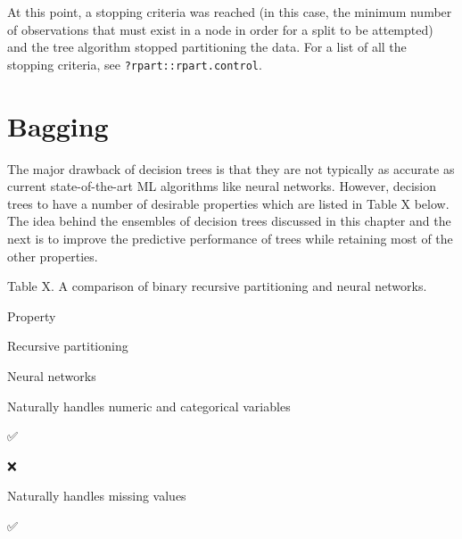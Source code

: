 \documentclass[]{book}
\newenvironment{Shaded}{\begin{snugshade}}{\end{snugshade}}
\newcommand{\CommentTok}[1]{\textcolor[rgb]{0.56,0.35,0.01}{\textit{#1}}}
\newcommand{\DecValTok}[1]{\textcolor[rgb]{0.00,0.00,0.81}{#1}}
\newcommand{\FloatTok}[1]{\textcolor[rgb]{0.00,0.00,0.81}{#1}}
\newcommand{\KeywordTok}[1]{\textcolor[rgb]{0.13,0.29,0.53}{\textbf{#1}}}
\newcommand{\NormalTok}[1]{#1}
\newcommand{\OperatorTok}[1]{\textcolor[rgb]{0.81,0.36,0.00}{\textbf{#1}}}
\newcommand{\StringTok}[1]{\textcolor[rgb]{0.31,0.60,0.02}{#1}}
\theoremstyle{definition}
\theoremstyle{definition}
\theoremstyle{definition}
\theoremstyle{remark}
\begin{document}
\begin{Shaded}
\end{Shaded}

At this point, a stopping criteria was reached (in this case, the
minimum number of observations that must exist in a node in order for a
split to be attempted) and the tree algorithm stopped partitioning the
data. For a list of all the stopping criteria, see
\texttt{?rpart::rpart.control}.

\hypertarget{bagging}{%
\section{Bagging}\label{bagging}}

The major drawback of decision trees is that they are not typically as
accurate as current state-of-the-art ML algorithms like neural networks.
However, decision trees to have a number of desirable properties which
are listed in Table X below. The idea behind the ensembles of decision
trees discussed in this chapter and the next is to improve the
predictive performance of trees while retaining most of the other
properties.

Table X. A comparison of binary recursive partitioning and neural
networks.

Property

Recursive \n partitioning

Neural networks

Naturally handles numeric and categorical variables

✅

❌

Naturally handles missing values

✅
\end{document}
